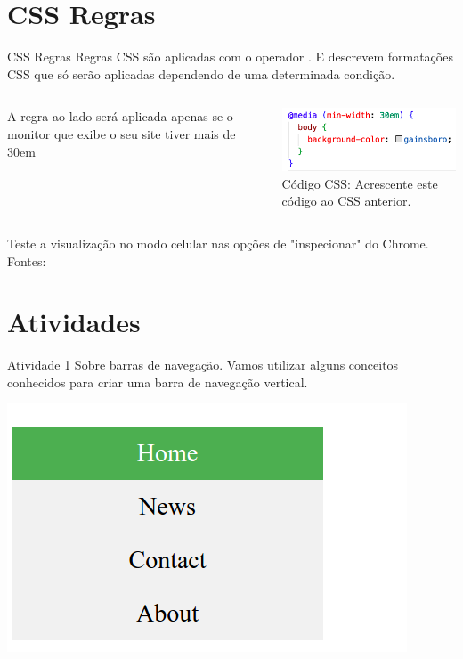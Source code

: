 \documentclass{beamer}
\begin{document}
\section{CSS Regras}
\begin{frame}{CSS Regras}
Regras CSS são aplicadas com o operador \@. E descrevem formatações CSS que só serão aplicadas dependendo de uma determinada condição.
\begin{columns}
\begin{column}{0.5\textwidth}
        A regra ao lado será aplicada apenas se o monitor que exibe o seu site tiver mais de 30em
   \end{column}
   \begin{column}{0.5\textwidth}
        \begin{center}
		  \includegraphics[height=0.2\paperheight]{fig/aula2/layout_css3.png} \\
		  \tiny{Código CSS: Acrescente este código ao CSS anterior.}
	  \end{center}
	  
   \end{column}
\end{columns}
Teste a visualização no modo celular nas opções de "inspecionar" do Chrome.\\
 \tiny Fontes: \cite{mdn2023}
\end{frame}

\section{Atividades}
\begin{frame}{Atividade 1}
Sobre barras de navegação. Vamos utilizar alguns conceitos conhecidos para criar uma barra de navegação 
vertical.
	\begin{center}
		  \includegraphics[height=0.4\paperheight]{fig/aula2/aep_1_2.png} \\
	  \end{center}
\end{frame}
\end{document}
